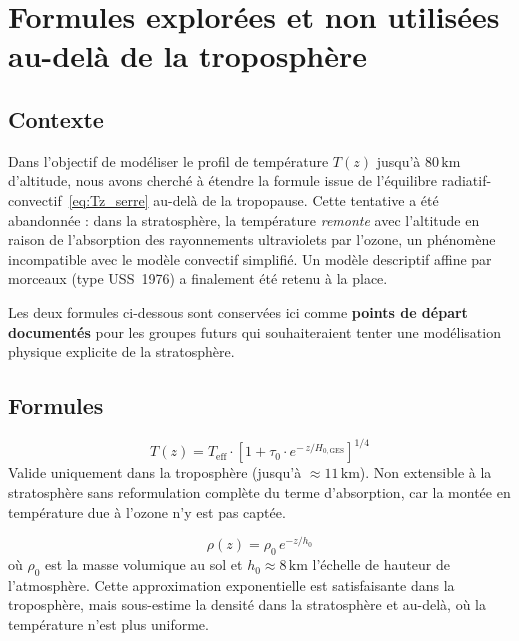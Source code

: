 \documentclass[a4paper,11pt]{article}
\begin{document}
\section{Formules explorées et non utilisées au-delà de la troposphère}
\label{sec:abandonnees}

\subsection{Contexte}

Dans l'objectif de modéliser le profil de température $T(z)$ jusqu'à
$80\,\mathrm{km}$ d'altitude, nous avons cherché à étendre la formule issue
de l'équilibre radiatif-convectif~\eqref{eq:Tz_serre} au-delà de la
tropopause. Cette tentative a été abandonnée : dans la stratosphère, la
température \emph{remonte} avec l'altitude en raison de l'absorption des
rayonnements ultraviolets par l'ozone, un phénomène incompatible avec le
modèle convectif simplifié. Un modèle descriptif affine par morceaux
(type USS~1976) a finalement été retenu à la place.

Les deux formules ci-dessous sont conservées ici comme \textbf{points de départ
documentés} pour les groupes futurs qui souhaiteraient tenter une modélisation
physique explicite de la stratosphère.

\subsection{Formules}

\begin{formule}[title=Formule 1 — Profil de température avec effet de serre]
\begin{equation}
  T(z) = T_{\mathrm{eff}} \cdot \left[1 + \tau_0 \cdot e^{-\,z/H_{0,\mathrm{GES}}}\right]^{1/4}
\end{equation}
Valide uniquement dans la troposphère (jusqu'à $\approx 11\,\mathrm{km}$).
Non extensible à la stratosphère sans reformulation complète du terme d'absorption,
car la montée en température due à l'ozone n'y est pas captée.
\end{formule}

\begin{formule}[title=Formule 2 — Profil de masse volumique (loi barométrique)]
\begin{equation}
  \rho(z) = \rho_0\, e^{-z/h_0}
\end{equation}
où $\rho_0$ est la masse volumique au sol et $h_0 \approx 8\,\mathrm{km}$
l'échelle de hauteur de l'atmosphère.
Cette approximation exponentielle est satisfaisante dans la troposphère, mais
sous-estime la densité dans la stratosphère et au-delà, où la température n'est
plus uniforme.
\end{formule}
\end{document}
